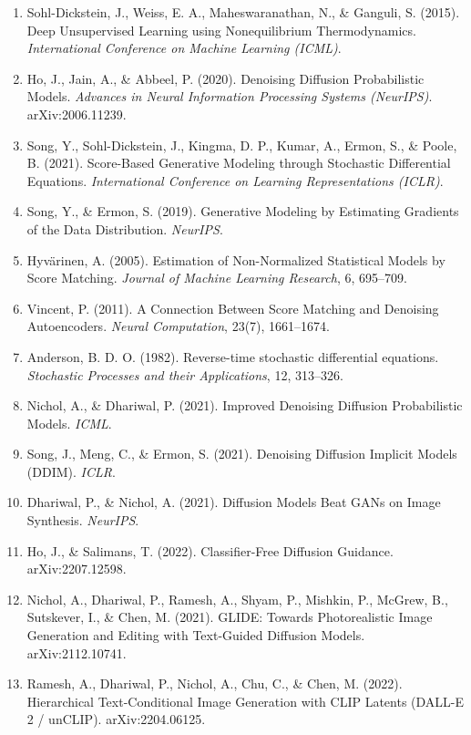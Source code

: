 \begin{enumerate}
\def\labelenumi{\arabic{enumi}.}
\item
  Sohl-Dickstein, J., Weiss, E. A., Maheswaranathan, N., \& Ganguli, S. (2015). Deep Unsupervised Learning using Nonequilibrium Thermodynamics. \emph{International Conference on Machine Learning (ICML)}.
\item
  Ho, J., Jain, A., \& Abbeel, P. (2020). Denoising Diffusion Probabilistic Models. \emph{Advances in Neural Information Processing Systems (NeurIPS)}. arXiv:2006.11239.
\item
  Song, Y., Sohl-Dickstein, J., Kingma, D. P., Kumar, A., Ermon, S., \& Poole, B. (2021). Score-Based Generative Modeling through Stochastic Differential Equations. \emph{International Conference on Learning Representations (ICLR)}.
\item
  Song, Y., \& Ermon, S. (2019). Generative Modeling by Estimating Gradients of the Data Distribution. \emph{NeurIPS}.
\item
  Hyvärinen, A. (2005). Estimation of Non-Normalized Statistical Models by Score Matching. \emph{Journal of Machine Learning Research}, 6, 695--709.
\item
  Vincent, P. (2011). A Connection Between Score Matching and Denoising Autoencoders. \emph{Neural Computation}, 23(7), 1661--1674.
\item
  Anderson, B. D. O. (1982). Reverse-time stochastic differential equations. \emph{Stochastic Processes and their Applications}, 12, 313--326.
\item
  Nichol, A., \& Dhariwal, P. (2021). Improved Denoising Diffusion Probabilistic Models. \emph{ICML}.
\item
  Song, J., Meng, C., \& Ermon, S. (2021). Denoising Diffusion Implicit Models (DDIM). \emph{ICLR}.
\item
  Dhariwal, P., \& Nichol, A. (2021). Diffusion Models Beat GANs on Image Synthesis. \emph{NeurIPS}.
\item
  Ho, J., \& Salimans, T. (2022). Classifier-Free Diffusion Guidance. arXiv:2207.12598.
\item
  Nichol, A., Dhariwal, P., Ramesh, A., Shyam, P., Mishkin, P., McGrew, B., Sutskever, I., \& Chen, M. (2021). GLIDE: Towards Photorealistic Image Generation and Editing with Text-Guided Diffusion Models. arXiv:2112.10741.
\item
  Ramesh, A., Dhariwal, P., Nichol, A., Chu, C., \& Chen, M. (2022). Hierarchical Text-Conditional Image Generation with CLIP Latents (DALL-E 2 / unCLIP). arXiv:2204.06125.

\end{enumerate}
